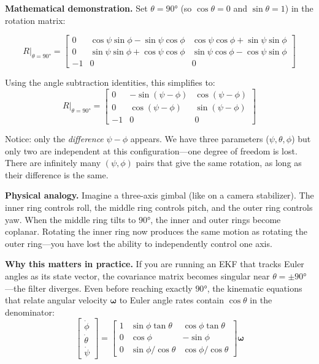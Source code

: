 \textbf{Mathematical demonstration.} Set $\theta = 90°$ (so $\cos\theta = 0$ and $\sin\theta = 1$) in the rotation matrix:

\begin{equation}
R\big|_{\theta=90°} = \begin{bmatrix}
0 & \cos\psi \sin\phi - \sin\psi \cos\phi & \cos\psi \cos\phi + \sin\psi \sin\phi \\
0 & \sin\psi \sin\phi + \cos\psi \cos\phi & \sin\psi \cos\phi - \cos\psi \sin\phi \\
-1 & 0 & 0
\end{bmatrix}
\end{equation}

Using the angle subtraction identities, this simplifies to:
\begin{equation}
R\big|_{\theta=90°} = \begin{bmatrix}
0 & -\sin(\psi - \phi) & \cos(\psi - \phi) \\
0 & \cos(\psi - \phi) & \sin(\psi - \phi) \\
-1 & 0 & 0
\end{bmatrix}
\end{equation}

Notice: only the \textit{difference} $\psi - \phi$ appears. We have three parameters ($\psi, \theta, \phi$) but only two are independent at this configuration---one degree of freedom is lost. There are infinitely many $(\psi, \phi)$ pairs that give the same rotation, as long as their difference is the same.

\textbf{Physical analogy.} Imagine a three-axis gimbal (like on a camera stabilizer). The inner ring controls roll, the middle ring controls pitch, and the outer ring controls yaw. When the middle ring tilts to $90°$, the inner and outer rings become coplanar. Rotating the inner ring now produces the same motion as rotating the outer ring---you have lost the ability to independently control one axis.

\textbf{Why this matters in practice.} If you are running an EKF that tracks Euler angles as its state vector, the covariance matrix becomes singular near $\theta = \pm 90°$---the filter diverges. Even before reaching exactly $90°$, the kinematic equations that relate angular velocity $\boldsymbol{\omega}$ to Euler angle rates contain $\cos\theta$ in the denominator:
\begin{equation}
\begin{bmatrix} \dot{\phi} \\ \dot{\theta} \\ \dot{\psi} \end{bmatrix}
= \begin{bmatrix}
1 & \sin\phi \tan\theta & \cos\phi \tan\theta \\
0 & \cos\phi & -\sin\phi \\
0 & \sin\phi / \cos\theta & \cos\phi / \cos\theta
\end{bmatrix}
\boldsymbol{\omega}
\end{equation}


